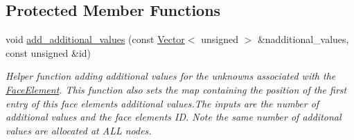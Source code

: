 \subsection*{Protected Member Functions}
\begin{DoxyCompactItemize}
\item 
void \hyperlink{classoomph_1_1FaceElement_a652aa3d84b6d91e0ce93bdb2e6718338}{add\+\_\+additional\+\_\+values} (const \hyperlink{classoomph_1_1Vector}{Vector}$<$ unsigned $>$ \&nadditional\+\_\+values, const unsigned \&id)
\begin{DoxyCompactList}\small\item\em Helper function adding additional values for the unknowns associated with the \hyperlink{classoomph_1_1FaceElement}{Face\+Element}. This function also sets the map containing the position of the first entry of this face element\textquotesingle{}s additional values.\+The inputs are the number of additional values and the face element\textquotesingle{}s ID. Note the same number of additonal values are allocated at A\+LL nodes. \end{DoxyCompactList}\end{DoxyCompactItemize}
